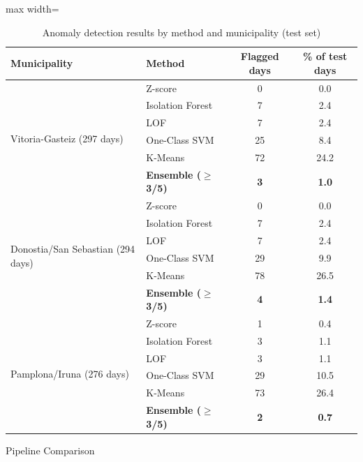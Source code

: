 ﻿\documentclass[12pt,reqno, twoside]{amsbook}
\makeatletter
\numberwithin{figure}{chapter}
\numberwithin{table}{chapter}
\numberwithin{equation}{chapter}
\def\subsection{\@startsection{subsection}{2}%
      \z@{.5\linespacing\@plus.7\linespacing}{.25\linespacing}%
      {\normalfont\bfseries\flushleft}}
\theoremstyle{plain}
\numberwithin{equation}{chapter}
\numberwithin{section}{chapter}
\makeatother
\begin{document}
\begin{table}[htbp]
\centering
\caption{Anomaly detection results by method and municipality (test set)}
\label{tab:anomaly_results}
\begin{adjustbox}{max width=\textwidth}
\begin{tabular}{llcc}
\toprule
\textbf{Municipality} & \textbf{Method} & \textbf{Flagged days} & \textbf{\% of test days} \\
\midrule
\multirow{6}{*}{Vitoria-Gasteiz (297 days)}
  & Z-score                       &  0 &  0.0 \\
  & Isolation Forest               &  7 &  2.4 \\
  & \ac{LOF}                      &  7 &  2.4 \\
  & One-Class \ac{SVM}            & 25 &  8.4 \\
  & K-Means                       & 72 & 24.2 \\
  & \textbf{Ensemble ($\geq$3/5)} & \textbf{3} & \textbf{1.0} \\
\midrule
\multirow{6}{*}{Donostia/San Sebastian (294 days)}
  & Z-score                       &  0 &  0.0 \\
  & Isolation Forest               &  7 &  2.4 \\
  & \ac{LOF}                      &  7 &  2.4 \\
  & One-Class \ac{SVM}            & 29 &  9.9 \\
  & K-Means                       & 78 & 26.5 \\
  & \textbf{Ensemble ($\geq$3/5)} & \textbf{4} & \textbf{1.4} \\
\midrule
\multirow{6}{*}{Pamplona/Iruna (276 days)}
  & Z-score                       &  1 &  0.4 \\
  & Isolation Forest               &  3 &  1.1 \\
  & \ac{LOF}                      &  3 &  1.1 \\
  & One-Class \ac{SVM}            & 29 & 10.5 \\
  & K-Means                       & 73 & 26.4 \\
  & \textbf{Ensemble ($\geq$3/5)} & \textbf{2} & \textbf{0.7} \\
\bottomrule
\end{tabular}
\end{adjustbox}
\end{table}

\FloatBarrier

\subsection{Pipeline Comparison}
\label{subsec:pipeline_comparison}
\end{document}
